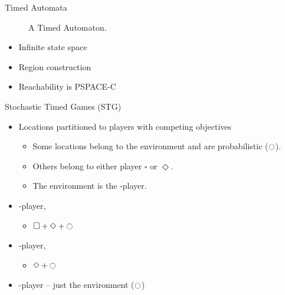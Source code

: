 \documentclass{beamer}
\begin{document}
\begin{frame}{Timed Automata~}
\begin{figure}[ht!]
     \caption{A Timed Automaton.}
    \label{fig:ex1}
  \end{figure}

  \begin{itemize}
     \item Infinite state space
      \item Region construction
        \item Reachability is PSPACE-C
        \end{itemize}
      \end{frame}

       \begin{frame}{Stochastic Timed Games (STG) }
         \begin{itemize}
         \item Locations partitioned to players with competing
           objectives
           \begin{itemize}
           \item Some locations belong to the environment and  are
             probabilistic ($\ocircle$).
             \item Others belong to either player $\square$  or
               $\Diamond$.
               \item The environment is the \half-player.
             \end{itemize}
         \item \twohalf-player,
           \begin{itemize}
             \item $\square + \Diamond + \ocircle$
           \end{itemize}
         \item \onehalf-player,
           \begin{itemize}
             \item $\Diamond + \ocircle$
           \end{itemize}
         \item \half-player -- just the environment ($\ocircle$)

         \end{itemize}

       \end{frame}
\end{document}
